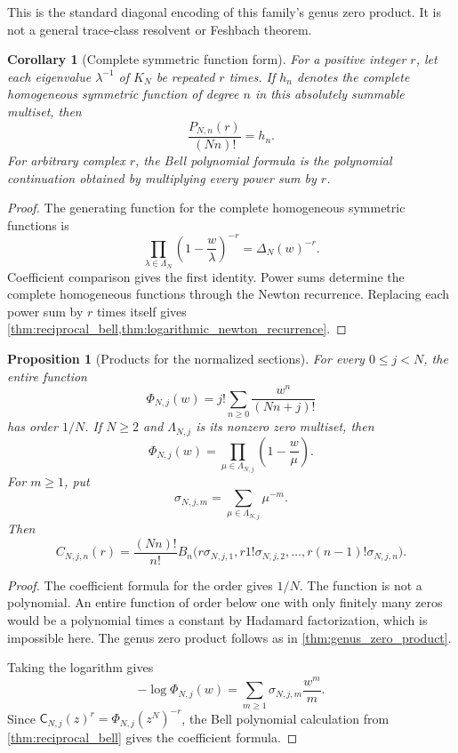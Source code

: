 \documentclass[11pt,letterpaper]{article}
\newtheorem{proposition}[proposition]{Proposition}
\newtheorem{corollary}[corollary]{Corollary}
\theoremstyle{definition}
\theoremstyle{remark}
\newcommand{\Cfun}{\mathsf C}
\begin{document}
This is the standard diagonal encoding of this family's genus zero product.
It is not a general trace-class resolvent or Feshbach theorem.

\begin{corollary}[Complete symmetric function form]\label{cor:complete_symmetric_form}
For a positive integer $r$, let each eigenvalue $\lambda^{-1}$ of $K_N$ be repeated $r$ times.  If $h_n$ denotes the complete homogeneous symmetric function of degree $n$ in this absolutely summable multiset, then
\[
\frac{P_{N,n}(r)}{(Nn)!}=h_n.
\]
For arbitrary complex $r$, the Bell polynomial formula is the polynomial continuation obtained by multiplying every power sum by $r$.
\end{corollary}

\begin{proof}
The generating function for the complete homogeneous symmetric functions is
\[
\prod_{\lambda\in\Lambda_N}
\left(1-\frac w\lambda\right)^{-r}
=
\Delta_N(w)^{-r}.
\]
Coefficient comparison gives the first identity.  Power sums determine the complete homogeneous functions through the Newton recurrence.  Replacing each power sum by $r$ times itself gives \cref{thm:reciprocal_bell,thm:logarithmic_newton_recurrence}.
\end{proof}


\begin{proposition}[Products for the normalized sections]\label{prop:normalized_section_product}
For every $0\leq j<N$, the entire function
\[
\Phi_{N,j}(w)
=
j!\sum_{n\geq0}\frac{w^n}{(Nn+j)!}
\]
has order $1/N$.  If $N\geq2$ and $\Lambda_{N,j}$ is its nonzero zero multiset, then
\[
\Phi_{N,j}(w)
=
\prod_{\mu\in\Lambda_{N,j}}
\left(1-\frac w\mu\right).
\]
For $m\geq1$, put
\[
\sigma_{N,j,m}
=
\sum_{\mu\in\Lambda_{N,j}}\mu^{-m}.
\]
Then
\[
C_{N,j,n}(r)
=
\frac{(Nn)!}{n!}
B_n\bigl(
 r\sigma_{N,j,1},
 r1!\sigma_{N,j,2},
 \ldots,
 r(n-1)!\sigma_{N,j,n}
\bigr).
\]
\end{proposition}

\begin{proof}
The coefficient formula for the order gives $1/N$.  The function is not a polynomial.  An entire function of order below one with only finitely many zeros would be a polynomial times a constant by Hadamard factorization, which is impossible here.  The genus zero product follows as in \cref{thm:genus_zero_product}.

Taking the logarithm gives
\[
-\log\Phi_{N,j}(w)
=
\sum_{m\geq1}\sigma_{N,j,m}\frac{w^m}{m}.
\]
Since $\Cfun_{N,j}(z)^r=\Phi_{N,j}(z^N)^{-r}$, the Bell polynomial calculation from \cref{thm:reciprocal_bell} gives the coefficient formula.
\end{proof}
\end{document}
